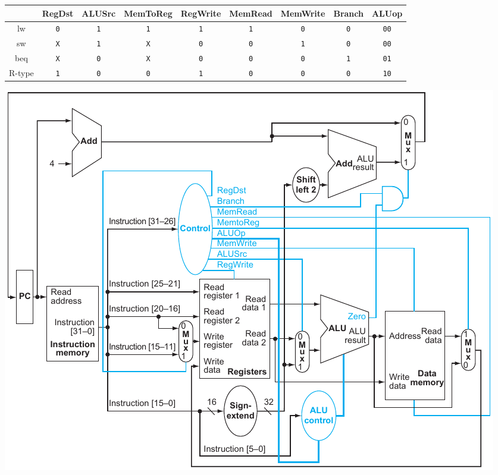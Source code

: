 \documentclass[10pt]{article}
\begin{document}
\begin{tabular}{ccccccccc}
    \toprule
           & RegDst     & ALUSrc     & MemToReg   & RegWrite   & MemRead    & MemWrite   & Branch     & ALUop       \\
    \midrule
    lw     & \texttt{0} & \texttt{1} & \texttt{1} & \texttt{1} & \texttt{1} & \texttt{0} & \texttt{0} & \texttt{00} \\
    sw     & \texttt{X} & \texttt{1} & \texttt{X} & \texttt{0} & \texttt{0} & \texttt{1} & \texttt{0} & \texttt{00} \\
    beq    & \texttt{X} & \texttt{0} & \texttt{X} & \texttt{0} & \texttt{0} & \texttt{0} & \texttt{1} & \texttt{01} \\
    R-type & \texttt{1} & \texttt{0} & \texttt{0} & \texttt{1} & \texttt{0} & \texttt{0} & \texttt{0} & \texttt{10} \\
    \bottomrule
\end{tabular}

\begin{center}
    \includegraphics{content/fig417.pdf}
\end{center}
\end{document}
